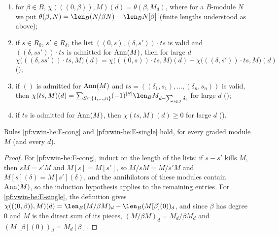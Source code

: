 \begin{enumerate}[label=(E\arabic*)]
then $\chi(ts,M)=\chi(ts',M)$;
\item\label{pf:vwin-he:E-single} for $\beta\in B$, $\chi(((0,\beta)),M)(d)=\theta(\beta,M_d)$, where for a $B$-module
$N$ we put $\theta(\beta,N)=\len_B(N/\beta N)-\len_BN[\beta]$ (finite lengths understood as above);
\item\label{pf:vwin-he:E-prod} if $s\in R_0$, $s'\in R_\delta$, the list $((0,s),(\delta,s'))\cdot ts$ is valid and
$((\delta,ss'))\cdot ts$ is admitted for $\operatorname{Ann}(M)$, then for large $d$
\[
 \chi\bigl(((\delta,ss'))\cdot ts,M\bigr)(d)=\chi\bigl(((0,s))\cdot ts,M\bigr)(d)+\chi\bigl(((\delta,s'))\cdot ts,M\bigr)(d)
\]
();
\item\label{pf:vwin-he:E-small} if $()$ is admitted for $\operatorname{Ann}(M)$ and $ts=((\delta_1,s_1),\dots,(\delta_n,s_n))$
is valid, then $\chi(ts,M)(d)=\sum_{S\subset\{1,\dots,n\}}(-1)^{|S|}\len_BM_{d-\sum_{i\in S}\delta_i}$ for large $d$
();
\item\label{pf:vwin-he:E-pos} if $ts$ is admitted for $\operatorname{Ann}(M)$, then $\chi(ts,M)(d)\ge0$ for large $d$
().
\end{enumerate}
\begin{lemma}\label{pf:vwin-he:E89}
Rules \ref{pf:vwin-he:E-cong} and \ref{pf:vwin-he:E-single} hold, for every graded module $M$ (and every $d$).
\end{lemma}

\begin{proof}
For \ref{pf:vwin-he:E-cong}, induct on the length of the lists: if $s-s'$ kills $M$, then $sM=s'M$ and $M[s]=M[s']$, so
$M/sM=M/s'M$ and $M[s](\delta)=M[s'](\delta)$, and the annihilators of these modules contain $\operatorname{Ann}(M)$, so the
induction hypothesis applies to the remaining entries. For \ref{pf:vwin-he:E-single}, the definition gives
$\chi(((0,\beta)),M)(d)=\len_B(M/\beta M)_d-\len_B(M[\beta](0))_d$, and since $\beta$ has degree $0$ and $M$ is the
direct sum of its pieces, $(M/\beta M)_d=M_d/\beta M_d$ and $(M[\beta](0))_d=M_d[\beta]$.
\end{proof}

